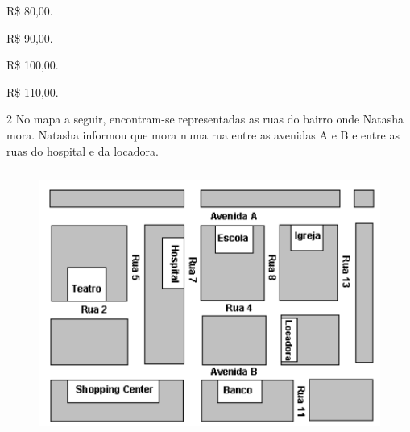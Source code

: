 \begin{multicols}{4}
\begin{escolha}
\item R\$ 80,00.
\item R\$ 90,00.
\item R\$ 100,00.
\item R\$ 110,00.
\end{escolha}
\end{multicols}
\enlargethispage{3\baselineskip}



\num{2} No mapa a seguir, encontram-se representadas as ruas do bairro onde
Natasha mora. Natasha informou que mora numa rua entre as avenidas A e B e entre as
ruas do hospital e da locadora.

\begin{figure}[H]
\centering\includegraphics[width=4.76042in,height=3.42708in]{./imgSAEB_6_MAT/media/image75.png}
\end{figure}

